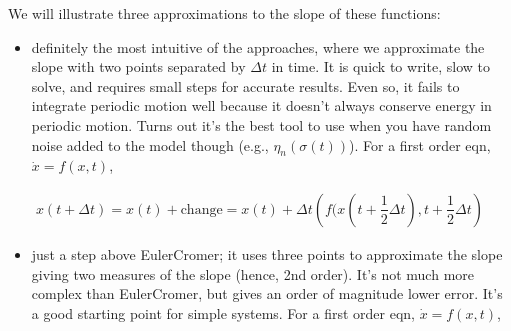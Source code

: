 \documentclass[letterpaper,10pt,english]{jupyterBook}
\begin{document}
\sphinxAtStartPar
We will illustrate three approximations to the slope of these functions:
\begin{itemize}
\item {} 
\sphinxAtStartPar
{} \sphinxhyphen{} definitely the most intuitive of the approaches, where we approximate the slope with two points separated by \(\Delta t\) in time. It is quick to write, slow to solve, and requires small steps for accurate results. Even so, it fails to integrate periodic motion well because it doesn’t always conserve energy in periodic motion. Turns out it’s the best tool to use when you have random noise added to the model though (e.g., \(\eta_n(\sigma(t))\)). For a first order eqn, \(\dot{x}=f(x,t)\),

\end{itemize}
\begin{equation*}
\begin{split}x(t+\Delta t) = x(t) + \textrm{change} = x(t) + \Delta t \left(f(x(t+\dfrac{1}{2}\Delta t), t+\dfrac{1}{2}\Delta t\right)\end{split}
\end{equation*}\begin{itemize}
\item {} 
\sphinxAtStartPar
{} \sphinxhyphen{} just a step above Euler\sphinxhyphen{}Cromer; it uses three points to approximate the slope giving two measures of the slope (hence, 2nd order). It’s not much more complex than Euler\sphinxhyphen{}Cromer, but gives an order of magnitude lower error. It’s a good starting point for simple systems. For a first order eqn, \(\dot{x}=f(x,t)\),

\end{itemize}
\end{document}
